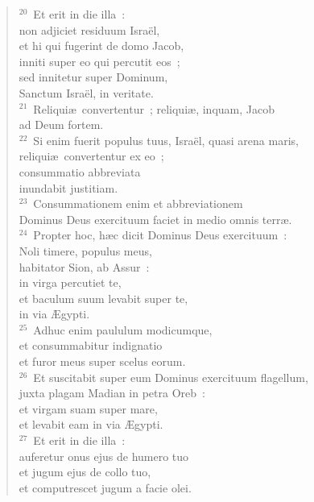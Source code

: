 \begin{flushleft}\begin{verse}${}^{20}$~Et erit in die illa~:\\ non adjiciet residuum Isra\"el,\\ et hi qui fugerint de domo Jacob,\\ inniti super eo qui percutit eos~;\\ sed innitetur super Dominum,\\ Sanctum Isra\"el, in veritate.\\
${}^{21}$~Reliqui\ae\ convertentur~; reliqui\ae , inquam, Jacob\\ ad Deum fortem.\\
${}^{22}$~Si enim fuerit populus tuus, Isra\"el, quasi arena maris,\\ reliqui\ae\ convertentur ex eo~;\\ consummatio abbreviata\\ inundabit justitiam.\\
${}^{23}$~Consummationem enim et abbreviationem\\ Dominus Deus exercituum faciet in medio omnis terr\ae .\\
${}^{24}$~Propter hoc, h\ae c dicit Dominus Deus exercituum~:\\ Noli timere, populus meus,\\ habitator Sion, ab Assur~:\\ in virga percutiet te,\\ et baculum suum levabit super te,\\ in via \AE gypti.\\
${}^{25}$~Adhuc enim paululum modicumque,\\ et consummabitur indignatio\\ et furor meus super scelus eorum.\\
${}^{26}$~Et suscitabit super eum Dominus exercituum flagellum,\\ juxta plagam Madian in petra Oreb~:\\ et virgam suam super mare,\\ et levabit eam in via \AE gypti.\\
${}^{27}$~Et erit in die illa~:\\ auferetur onus ejus de humero tuo\\ et jugum ejus de collo tuo,\\ et computrescet jugum a facie olei.\end{verse}\end{flushleft}


